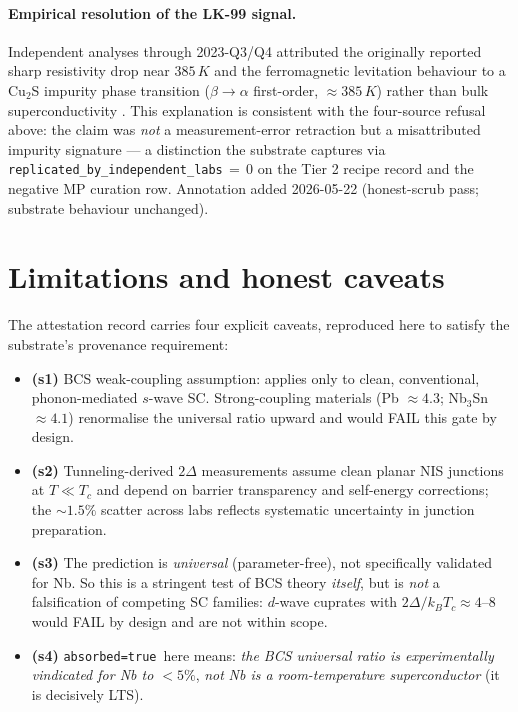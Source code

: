\documentclass[11pt,a4paper]{article}
\newcommand{\absorbedtrue}{\textcolor{honestgreen}{\texttt{absorbed=true}}}
\begin{document}
\paragraph{Empirical resolution of the LK-99 signal.}
Independent analyses through 2023-Q3/Q4 attributed the originally
reported sharp resistivity drop near $385\,K$ and the ferromagnetic
levitation behaviour to a {Cu}$_{2}${S} impurity phase transition
($\beta \to \alpha$ first-order, $\approx 385\,K$) rather than bulk
superconductivity \cite{jain2023lk99cu2s,zhu2023lk99cu2s}. This
explanation is consistent with the four-source refusal above: the
claim was \emph{not} a measurement-error retraction but a misattributed
impurity signature --- a distinction the substrate captures via
\texttt{replicated\_by\_independent\_labs}\,\(=\,0\) on the Tier 2
recipe record and the negative MP curation row. Annotation added
2026-05-22 (honest-scrub pass; substrate behaviour unchanged).

\section{Limitations and honest caveats}
\label{sec:limits}

The attestation record carries four explicit caveats, reproduced here
to satisfy the substrate's provenance requirement:

\begin{itemize}\itemsep0.3em
\item \textbf{(s1)} BCS weak-coupling assumption: applies only to clean,
  conventional, phonon-mediated $s$-wave SC. Strong-coupling materials
  (Pb \(\approx 4.3\); Nb$_{3}$Sn \(\approx 4.1\)) renormalise the
  universal ratio upward and would FAIL this gate by design.
\item \textbf{(s2)} Tunneling-derived \(2\Delta\) measurements assume
  clean planar NIS junctions at \(T \ll T_{c}\) and depend on barrier
  transparency and self-energy corrections; the \(\sim 1.5\%\) scatter
  across labs reflects systematic uncertainty in junction preparation.
\item \textbf{(s3)} The prediction is \emph{universal} (parameter-free),
  not specifically validated for Nb. So this is a stringent test of
  BCS theory \emph{itself}, but is \emph{not} a falsification of
  competing SC families: $d$-wave cuprates with \(2\Delta/k_{B}T_{c}
  \approx 4\text{--}8\) would FAIL by design and are not within scope.
\item \textbf{(s4)} \absorbedtrue\ here means: \emph{the BCS universal
  ratio is experimentally vindicated for Nb to \(<5\%\)}, \emph{not}
  \emph{Nb is a room-temperature superconductor} (it is decisively LTS).
\end{itemize}
\end{document}
